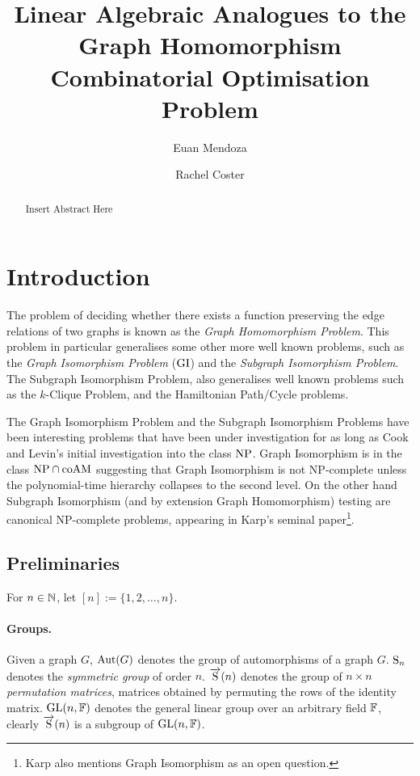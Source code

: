 \documentclass[a4paper,12pt]{article}
\title{
    Linear Algebraic Analogues to the Graph Homomorphism Combinatorial Optimisation Problem
}
\author{
    Euan Mendoza
    \and
    Rachel Coster
}
\begin{document}
\maketitle

\begin{abstract}
    Insert Abstract Here
\end{abstract}
\newpage

\tableofcontents

\section{Introduction}\label{sec:introduction}

The problem of deciding whether there exists a function preserving the edge relations of two graphs is known as the \textit{Graph Homomorphism Problem}. This problem in particular generalises some other more well known problems, such as the \textit{Graph Isomorphism Problem} ($\GIp$) and the \textit{Subgraph Isomorphism Problem}. The Subgraph Isomorphism Problem, also generalises well known problems such as the $k$-Clique Problem, and the Hamiltonian Path/Cycle problems.

The Graph Isomorphism Problem and the Subgraph Isomorphism Problems have been interesting problems that have been under investigation for as long as Cook and Levin's initial investigation into the class $\NP$. Graph Isomorphism is in the class $\NP \cap \coAM$ suggesting that Graph Isomorphism is not NP-complete unless the polynomial-time hierarchy collapses to the second level. On the other hand Subgraph Isomorphism (and by extension Graph Homomorphism) testing are canonical NP-complete problems, appearing in Karp's seminal paper\footnote{Karp also mentions Graph Isomorphism as an open question.}.


\subsection{Preliminaries}\label{sec:preliminaries}

For $n\in \N$, let $[n] := \{ 1, 2, \ldots, n \}$.

\paragraph{Groups.} Given a graph $G$, $\Aut(G)$ denotes the group of automorphisms of a graph $G$. $\S_{n}$ denotes the \textit{symmetric group} of order $n$. $\pS(n)$ denotes the group of $n{\times}n$ \textit{permutation matrices}, matrices obtained by permuting the rows of the identity matrix. $\GL(n,\F)$ denotes the general linear group over an arbitrary field $\F$, clearly $\pS(n)$ is a subgroup of $\GL(n,\F)$.
\end{document}
